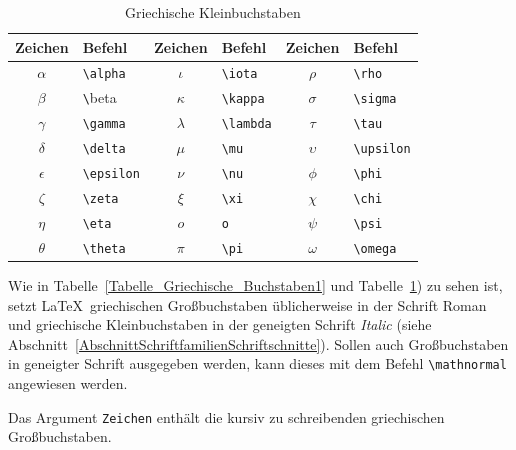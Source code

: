 \documentclass[a4paper,10pt,twoside]{scrbook}
\begin{document}
\begin{table}[h!tb]
\centering
\caption{Griechische Kleinbuchstaben}
\label{Tabelle_Griechische_Buchstaben2}       %
\begin{tabular}{clclcl}
\hline
Zeichen & Befehl & Zeichen & Befehl & Zeichen & Befehl \\
\hline
\(\alpha\) & \texttt{\textbackslash alpha} & 
\(\iota\) & \texttt{\textbackslash iota} &
\(\rho\) & \texttt{\textbackslash rho}\\
\(\beta\) & {\texttt \textbackslash beta} &
\(\kappa\) & \texttt{\textbackslash kappa} &
\(\sigma\) & \texttt{\textbackslash sigma}\\
\(\gamma\) & \texttt{\textbackslash gamma} & 
\(\lambda\) & \texttt{\textbackslash lambda} &
\(\tau\) & \texttt{\textbackslash tau} \\
\(\delta\) & \texttt{\textbackslash delta} &
\(\mu\) & \texttt{\textbackslash mu} &
\(\upsilon\) & \texttt{\textbackslash upsilon} \\
\(\epsilon\) & \texttt{\textbackslash epsilon} & 
\(\nu\) & \texttt{\textbackslash nu} &
\(\phi\) & \texttt{\textbackslash phi} \\
\(\zeta\) & \texttt{\textbackslash zeta} & 
\(\xi\) & \texttt{\textbackslash xi} &
\(\chi\) & \texttt{\textbackslash chi}\\
\(\eta\) & \texttt{\textbackslash eta} & 
\(o\) & \texttt{o} &
\(\psi\) & \texttt{\textbackslash psi} \\
\(\theta\) & \texttt{\textbackslash theta} & 
\(\pi\) & \texttt{\textbackslash pi} &
\(\omega\) & \texttt{\textbackslash omega} \\
\hline
\end{tabular}
\end{table}

Wie in Tabelle~\ref{Tabelle_Griechische_Buchstaben1} und Tabelle~\ref{Tabelle_Griechische_Buchstaben2}) zu sehen ist, 
setzt \LaTeX\ griechischen Großbuchstaben üblicherweise in der Schrift Roman und griechische Kleinbuchstaben in der geneigten Schrift \textit{Italic} (siehe Abschnitt~\ref{AbschnittSchriftfamilienSchriftschnitte}).
Sollen auch Großbuchstaben in geneigter Schrift ausgegeben werden, kann dieses mit dem Befehl 
\verb!\mathnormal! angewiesen werden.


Das Argument \verb!Zeichen! enthält die
kursiv zu schreibenden griechischen Großbuchstaben.
\end{document}
